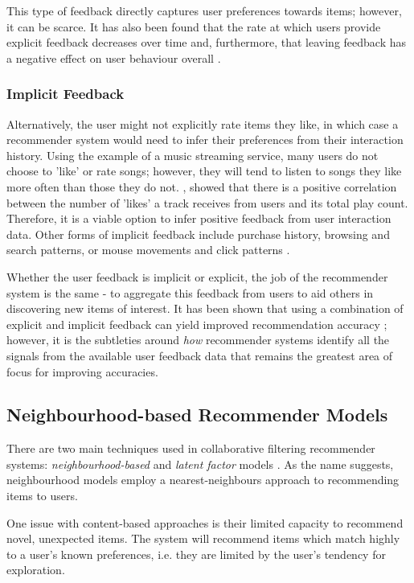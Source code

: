 This type of feedback directly captures user preferences towards items; however, it can be scarce. It has also been found that the rate at which users provide explicit feedback decreases over time and, furthermore, that leaving feedback has a negative effect on user behaviour overall \parencite{cf_1.5_explicit}.

\subsubsection{Implicit Feedback}
Alternatively, the user might not explicitly rate items they like, in which case a recommender system would need to infer their preferences from their interaction history. Using the example of a music streaming service, many users do not choose to 'like' or rate songs; however, they will tend to listen to songs they like more often than those they do not. \cite{cf_1.5_explicit}, showed that there is a positive correlation between the number of 'likes' a track receives from users and its total play count. Therefore, it is a viable option to infer positive feedback from user interaction data. Other forms of implicit feedback include purchase history, browsing and search patterns, or mouse movements and click patterns \parencite{handbook_1.5_cf}.

Whether the user feedback is implicit or explicit, the job of the recommender system is the same - to aggregate this feedback from users to aid others in discovering new items of interest. It has been shown that using a combination of explicit and implicit feedback can yield improved recommendation accuracy \parencite{cf_1.4_comparison}; however, it is the subtleties around \textit{how} recommender systems identify all the signals from the available user feedback data that remains the greatest area of focus for improving accuracies.

\subsection{Neighbourhood-based Recommender Models}
There are two main techniques used in collaborative filtering recommender systems: \textit{neighbourhood-based} and \textit{latent factor} models \parencite{handbook_1.5_cf}. As the name suggests, neighbourhood models employ a nearest-neighbours approach to recommending items to users.

One issue with content-based approaches is their limited capacity to recommend novel, unexpected items. The system will recommend items which match highly to a user's known preferences, i.e. they are limited by the user's tendency for exploration. \parencite{handbook_1.3_content-based}

